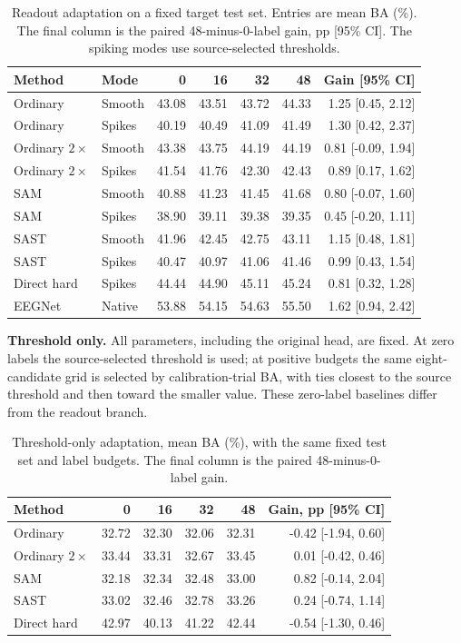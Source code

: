 \documentclass[11pt,a4paper]{article}
\begin{document}
\begin{table}[h]
\centering\small\setlength{\tabcolsep}{5pt}
\caption{Readout adaptation on a fixed target test set. Entries are mean BA
(\%). The final column is the paired 48-minus-0-label gain, pp [95\% CI].
The spiking modes use source-selected thresholds.}
\begin{tabular}{llrrrrr}
\toprule
Method & Mode & 0 & 16 & 32 & 48 & Gain [95\% CI] \\
\midrule
Ordinary & Smooth & 43.08 & 43.51 & 43.72 & 44.33 & 1.25 [0.45, 2.12] \\
Ordinary & Spikes & 40.19 & 40.49 & 41.09 & 41.49 & 1.30 [0.42, 2.37] \\
Ordinary $2\times$ & Smooth & 43.38 & 43.75 & 44.19 & 44.19 & 0.81 [-0.09, 1.94] \\
Ordinary $2\times$ & Spikes & 41.54 & 41.76 & 42.30 & 42.43 & 0.89 [0.17, 1.62] \\
SAM & Smooth & 40.88 & 41.23 & 41.45 & 41.68 & 0.80 [-0.07, 1.60] \\
SAM & Spikes & 38.90 & 39.11 & 39.38 & 39.35 & 0.45 [-0.20, 1.11] \\
SAST & Smooth & 41.96 & 42.45 & 42.75 & 43.11 & 1.15 [0.48, 1.81] \\
SAST & Spikes & 40.47 & 40.97 & 41.06 & 41.46 & 0.99 [0.43, 1.54] \\
Direct hard & Spikes & 44.44 & 44.90 & 45.11 & 45.24 & 0.81 [0.32, 1.28] \\
EEGNet & Native & 53.88 & 54.15 & 54.63 & 55.50 & 1.62 [0.94, 2.42] \\
\bottomrule
\end{tabular}
\end{table}

\textbf{Threshold only.} All parameters, including the original head, are
fixed. At zero labels the source-selected threshold is used; at positive
budgets the same eight-candidate grid is selected by calibration-trial BA,
with ties closest to the source threshold and then toward the smaller value.
These zero-label baselines differ from the readout branch.

\begin{table}[h]
\centering\small
\caption{Threshold-only adaptation, mean BA (\%), with the same fixed test
set and label budgets. The final column is the paired 48-minus-0-label gain.}
\begin{tabular}{lrrrrr}
\toprule
Method & 0 & 16 & 32 & 48 & Gain, pp [95\% CI] \\
\midrule
Ordinary & 32.72 & 32.30 & 32.06 & 32.31 & -0.42 [-1.94, 0.60] \\
Ordinary $2\times$ & 33.44 & 33.31 & 32.67 & 33.45 & 0.01 [-0.42, 0.46] \\
SAM & 32.18 & 32.34 & 32.48 & 33.00 & 0.82 [-0.14, 2.04] \\
SAST & 33.02 & 32.46 & 32.78 & 33.26 & 0.24 [-0.74, 1.14] \\
Direct hard & 42.97 & 40.13 & 41.22 & 42.44 & -0.54 [-1.30, 0.46] \\
\bottomrule
\end{tabular}
\end{table}
\end{document}
